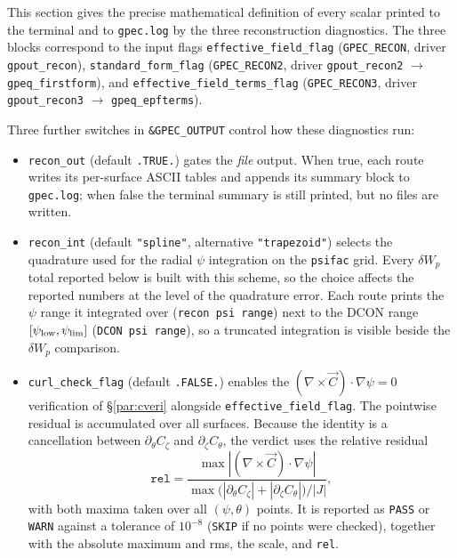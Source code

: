 \documentclass[10pt,a4paper]{article}
\numberwithin{equation}{section}
\begin{document}
This section gives the precise mathematical definition of every scalar
printed to the terminal and to \texttt{gpec.log} by the three reconstruction
diagnostics.  The three blocks correspond to the input flags
\texttt{effective\_field\_flag} (\texttt{GPEC\_RECON}, driver \texttt{gpout\_recon}),
\texttt{standard\_form\_flag} (\texttt{GPEC\_RECON2}, driver \texttt{gpout\_recon2}
$\to$ \texttt{gpeq\_firstform}), and \texttt{effective\_field\_terms\_flag}
(\texttt{GPEC\_RECON3}, driver \texttt{gpout\_recon3} $\to$
\texttt{gpeq\_epfterms}).

Three further switches in \texttt{\&GPEC\_OUTPUT} control how these
diagnostics run:
\begin{itemize}
\item \texttt{recon\_out} (default \texttt{.TRUE.}) gates the
  \emph{file} output.  When true, each route writes its per-surface
  ASCII tables and appends its summary block to \texttt{gpec.log};
  when false the terminal summary is still printed, but no files are
  written.
\item \texttt{recon\_int} (default \texttt{"spline"}, alternative
  \texttt{"trapezoid"}) selects the quadrature used for the radial
  $\psi$ integration on the \texttt{psifac} grid.  Every
  $\delta W_p$ total reported below is built with this scheme, so the
  choice affects the reported numbers at the level of the quadrature
  error.  Each route prints the $\psi$ range it integrated over
  (\texttt{recon psi range}) next to the DCON range
  $[\psi_{\rm low},\psi_{\rm lim}]$ (\texttt{DCON psi range}), so a
  truncated integration is visible beside the $\delta W_p$ comparison.
\item \texttt{curl\_check\_flag} (default \texttt{.FALSE.}) enables the
  $(\nabla\times\vec C)\cdot\nabla\psi=0$ verification of
  \S\ref{par:cveri} alongside \texttt{effective\_field\_flag}.  The pointwise
  residual is accumulated over all surfaces.  Because the identity is
  a cancellation between $\partial_\theta C_\zeta$ and
  $\partial_\zeta C_\theta$, the verdict uses the relative residual
  \begin{equation*}
  \texttt{rel}=\frac{\max|(\nabla\times\vec C)\cdot\nabla\psi|}
  {\max\big(|\partial_\theta C_\zeta|+|\partial_\zeta C_\theta|\big)/|J|},
  \end{equation*}
  with both maxima taken over all $(\psi,\theta)$ points.  It is
  reported as \texttt{PASS} or \texttt{WARN} against a tolerance of
  $10^{-8}$ (\texttt{SKIP} if no points were checked), together with
  the absolute maximum and rms, the scale, and \texttt{rel}.
\end{itemize}
\end{document}
